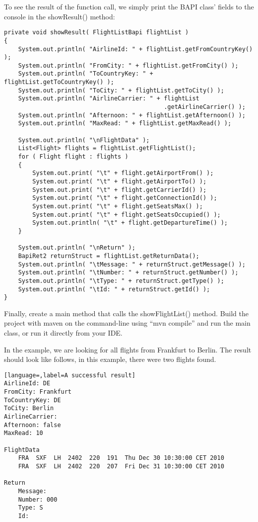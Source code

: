 To see the result of the function call, we simply print the BAPI class' fields to the console in the
showResult() method:

\begin{lstlisting}[caption=Printing the results]
private void showResult( FlightListBapi flightList )
{
    System.out.println( "AirlineId: " + flightList.getFromCountryKey() );
    System.out.println( "FromCity: " + flightList.getFromCity() );
    System.out.println( "ToCountryKey: " + flightList.getToCountryKey() );
    System.out.println( "ToCity: " + flightList.getToCity() );
    System.out.println( "AirlineCarrier: " + flightList
                                             .getAirlineCarrier() );
    System.out.println( "Afternoon: " + flightList.getAfternoon() );
    System.out.println( "MaxRead: " + flightList.getMaxRead() );

    System.out.println( "\nFlightData" );
    List<Flight> flights = flightList.getFlightList();
    for ( Flight flight : flights )
    {
        System.out.print( "\t" + flight.getAirportFrom() );
        System.out.print( "\t" + flight.getAirportTo() );
        System.out.print( "\t" + flight.getCarrierId() );
        System.out.print( "\t" + flight.getConnectionId() );
        System.out.print( "\t" + flight.getSeatsMax() );
        System.out.print( "\t" + flight.getSeatsOccupied() );
        System.out.println( "\t" + flight.getDepartureTime() );
    }

    System.out.println( "\nReturn" );
    BapiRet2 returnStruct = flightList.getReturnData();
    System.out.println( "\tMessage: " + returnStruct.getMessage() );
    System.out.println( "\tNumber: " + returnStruct.getNumber() );
    System.out.println( "\tType: " + returnStruct.getType() );
    System.out.println( "\tId: " + returnStruct.getId() );
}
\end{lstlisting}

Finally, create a main method that calls the showFlightList() method. Build the project with maven on the command-line using ``mvn compile'' and run the main class, or run it directly from your IDE.

In the example, we are looking for all flights from Frankfurt to Berlin.
The result should look like follows, in this example, there were two flights found.

\begin{lstlisting}[language=,label=A successful result]
AirlineId: DE
FromCity: Frankfurt
ToCountryKey: DE
ToCity: Berlin
AirlineCarrier:
Afternoon: false
MaxRead: 10

FlightData
	FRA  SXF  LH  2402  220  191  Thu Dec 30 10:30:00 CET 2010
	FRA  SXF  LH  2402  220  207  Fri Dec 31 10:30:00 CET 2010

Return
	Message:
	Number: 000
	Type: S
	Id:
\end{lstlisting}

